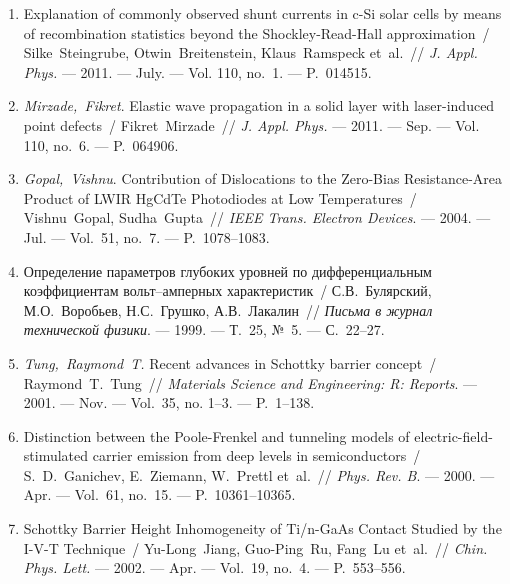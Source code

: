 \begin{center}
\textbf{\MakeUppercase{\fullbibtitle}}
\end{center}
\begin{enumerate}[label=\arabic*$^*$.,leftmargin=2em,itemindent=0cm]

\item
Explanation of commonly observed shunt currents in c-Si solar cells by means of
  recombination statistics beyond the Shockley-Read-Hall approximation~/
  Silke~Steingrube, Otwin~Breitenstein, Klaus~Ramspeck et~al.~// \emph{J.
  Appl. Phys.} ---
  2011. --- July. ---
  Vol. 110, no.~1. ---
  P.~014515.

\item
\emph{Mirzade,~Fikret}. Elastic wave propagation in a solid layer with
  laser-induced point defects~/ Fikret~Mirzade~// \emph{J. Appl. Phys.} ---
  2011. --- Sep. ---
  Vol. 110, no.~6. ---
  P.~064906.

\item
\emph{Gopal,~Vishnu}. Contribution of Dislocations to the Zero-Bias
  Resistance-Area Product of {LWIR} {H}g{C}d{T}e Photodiodes at Low
  Temperatures~/ Vishnu~Gopal, Sudha~Gupta~// \emph{IEEE Trans. Electron
  Devices}. ---
  2004. --- Jul. ---
  Vol.~51, no.~7. ---
  P.~1078--1083.

\item
Определение параметров глубоких уровней
  по дифференциальным коэффициентам
  вольт--амперных характеристик~/
  С.В.~Булярский, М.О.~Воробьев, Н.С.~Грушко,
  А.В.~Лакалин~// \emph{Письма в журнал
  технической физики}. ---
  1999. ---
  Т.~25, {№}~5. ---
  {С.}~22--27.

\item
\emph{Tung,~Raymond~T.} Recent advances in {S}chottky barrier concept~/
  Raymond~T.~Tung~// \emph{Materials Science and Engineering: R: Reports}.
  ---
  2001. --- Nov. ---
  Vol.~35, no. 1--3. ---
  P.~1--138.

\item
Distinction between the {P}oole-{F}renkel and tunneling models of
  electric-field-stimulated carrier emission from deep levels in
  semiconductors~/ S.~D.~Ganichev, E.~Ziemann, W.~Prettl et~al.~//
  \emph{Phys. Rev. B}. ---
  2000. --- Apr. ---
  Vol.~61, no.~15. ---
  P.~10361--10365.

\item
Schottky Barrier Height Inhomogeneity of Ti/n-GaAs Contact Studied by the I-V-T
  Technique~/ Yu-Long~Jiang, Guo-Ping~Ru, Fang~Lu et~al.~// \emph{Chin.
  Phys. Lett.} ---
  2002. --- Apr. ---
  Vol.~19, no.~4. ---
  P.~553--556.


\end{enumerate}
